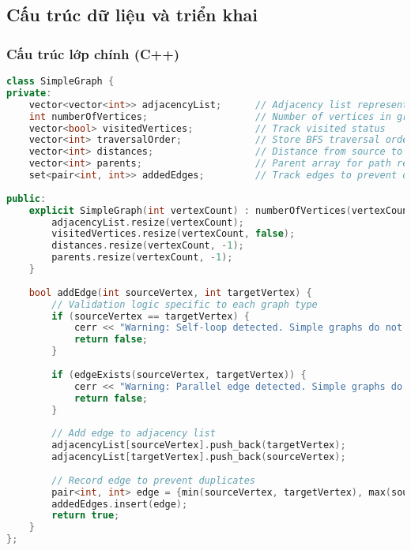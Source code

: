 \documentclass[12pt]{article}
\begin{document}
\subsection*{Cấu trúc dữ liệu và triển khai}

\subsubsection*{Cấu trúc lớp chính (C++)}
\begin{lstlisting}[language=C++, basicstyle=\ttfamily\footnotesize, frame=single]
class SimpleGraph {
private:
    vector<vector<int>> adjacencyList;      // Adjacency list representation
    int numberOfVertices;                   // Number of vertices in graph
    vector<bool> visitedVertices;           // Track visited status
    vector<int> traversalOrder;             // Store BFS traversal order
    vector<int> distances;                  // Distance from source to each vertex
    vector<int> parents;                    // Parent array for path reconstruction
    set<pair<int, int>> addedEdges;         // Track edges to prevent duplicates
    
public:
    explicit SimpleGraph(int vertexCount) : numberOfVertices(vertexCount) {
        adjacencyList.resize(vertexCount);
        visitedVertices.resize(vertexCount, false);
        distances.resize(vertexCount, -1);
        parents.resize(vertexCount, -1);
    }
    
    bool addEdge(int sourceVertex, int targetVertex) {
        // Validation logic specific to each graph type
        if (sourceVertex == targetVertex) {
            cerr << "Warning: Self-loop detected. Simple graphs do not support self-loops.\n";
            return false;
        }
        
        if (edgeExists(sourceVertex, targetVertex)) {
            cerr << "Warning: Parallel edge detected. Simple graphs do not support parallel edges.\n";
            return false;
        }
        
        // Add edge to adjacency list
        adjacencyList[sourceVertex].push_back(targetVertex);
        adjacencyList[targetVertex].push_back(sourceVertex);
        
        // Record edge to prevent duplicates
        pair<int, int> edge = {min(sourceVertex, targetVertex), max(sourceVertex, targetVertex)};
        addedEdges.insert(edge);
        return true;
    }
};
\end{lstlisting}
\end{document}
